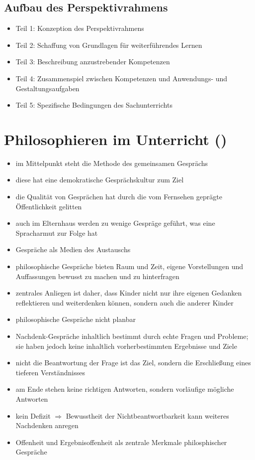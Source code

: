 \subsection{Aufbau des Perspektivrahmens}
\begin{itemize}
	\item{Teil 1: Konzeption des Perspektivrahmens}
	\item{Teil 2: Schaffung von Grundlagen für weiterführendes Lernen}
	\item{Teil 3: Beschreibung anzustrebender Kompetenzen}
	\item{Teil 4: Zusammenspiel zwischen Kompetenzen und Anwendungs- und Gestaltungsaufgaben}
	\item{Teil 5: Spezifische Bedingungen des Sachunterrichts}
\end{itemize}

\newpage
\section{Philosophieren im Unterricht (\cite{KM06})}
\begin{itemize}
	\item{im Mittelpunkt steht die Methode des gemeinsamen Gesprächs}
	\item{diese hat eine demokratische Gesprächskultur zum Ziel}
	\item{die Qualität von Gesprächen hat durch die vom Fernsehen geprägte Öffentlichkeit gelitten}
	\item{auch im Elternhaus werden zu wenige Gespräge geführt, was eine Spracharmut zur Folge hat}
	\item{Gespräche als Medien des Austauschs}
	\item{philosophische Gespräche bieten Raum und Zeit, eigene Vorstellungen und Auffassungen bewusst zu machen und zu hinterfragen}
	\item{zentrales Anliegen ist daher, dass Kinder nicht nur ihre eigenen Gedanken reflektieren und weiterdenken können, sondern auch die anderer Kinder}
	\item{philosophische Gespräche nicht planbar}
	\item{Nachdenk-Gespräche inhaltlich bestimmt durch echte Fragen und Probleme; sie haben jedoch keine inhaltlich vorherbestimmten Ergebnisse und Ziele}
	\item{nicht die Beantwortung der Frage ist das Ziel, sondern die Erschließung eines tieferen Verständnisses}
	\item{am Ende stehen keine richtigen Antworten, sondern vorläufige mögliche Antworten}
	\item{kein Defizit $\Rightarrow$ Bewusstheit der Nichtbeantwortbarkeit kann weiteres Nachdenken anregen}
	\item{Offenheit und Ergebnisoffenheit als zentrale Merkmale philosphischer Gespräche}
\end{itemize}

